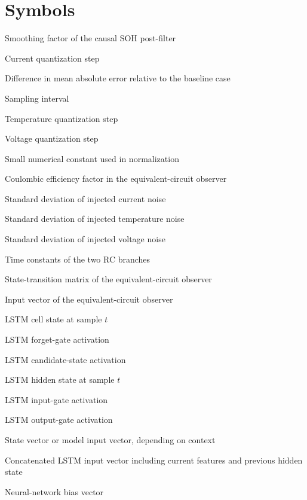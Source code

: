 \documentclass[
    a4paper,
    12pt,
    titlepage,
    bibliography=totoc,
    twoside=on,
    parskip=false,
    numbers=noenddot,
    cleardoublepage=empty,
    DIV=12,
    BCOR=12.0mm,
    headheight=36pt,
    headings=openright
]{scrreprt}
\begin{document}
\chapter*{Symbols}
\begin{description}[style=nextline,leftmargin=3.2cm]
\item[$\alpha$] Smoothing factor of the causal SOH post-filter
\item[$\Delta I$] Current quantization step
\item[$\Delta\mathrm{MAE}$] Difference in mean absolute error relative to the baseline case
\item[$\Delta t$] Sampling interval
\item[$\Delta T$] Temperature quantization step
\item[$\Delta U$] Voltage quantization step
\item[$\varepsilon$] Small numerical constant used in normalization
\item[$\eta$] Coulombic efficiency factor in the equivalent-circuit observer
\item[$\sigma_I$] Standard deviation of injected current noise
\item[$\sigma_T$] Standard deviation of injected temperature noise
\item[$\sigma_U$] Standard deviation of injected voltage noise
\item[$\tau_1,\tau_2$] Time constants of the two RC branches
\item[$\mathbf{A}$] State-transition matrix of the equivalent-circuit observer
\item[$\mathbf{b}$] Input vector of the equivalent-circuit observer
\item[$\mathbf{c}_t$] LSTM cell state at sample $t$
\item[$\mathbf{f}_t$] LSTM forget-gate activation
\item[$\mathbf{g}_t$] LSTM candidate-state activation
\item[$\mathbf{h}_t$] LSTM hidden state at sample $t$
\item[$\mathbf{i}_t$] LSTM input-gate activation
\item[$\mathbf{o}_t$] LSTM output-gate activation
\item[$\mathbf{x}$] State vector or model input vector, depending on context
\item[$\mathbf{z}_t$] Concatenated LSTM input vector including current features and previous hidden state
\item[$b$] Neural-network bias vector

\end{description}
\end{document}
